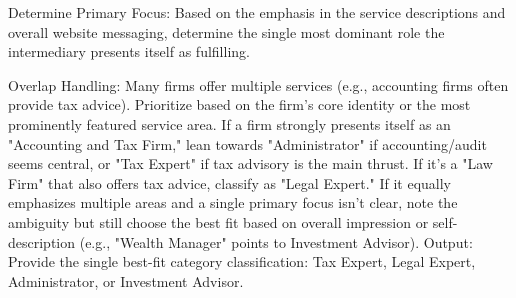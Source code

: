 Determine Primary Focus: Based on the emphasis in the service descriptions and overall website messaging, determine the single most dominant role the intermediary presents itself as fulfilling.

Overlap Handling: Many firms offer multiple services (e.g., accounting firms often provide tax advice). Prioritize based on the firm's core identity or the most prominently featured service area. If a firm strongly presents itself as an "Accounting and Tax Firm," lean towards "Administrator" if accounting/audit seems central, or "Tax Expert" if tax advisory is the main thrust. If it's a "Law Firm" that also offers tax advice, classify as "Legal Expert." If it equally emphasizes multiple areas and a single primary focus isn't clear, note the ambiguity but still choose the best fit based on overall impression or self-description (e.g., "Wealth Manager" points to Investment Advisor).
Output: Provide the single best-fit category classification: Tax Expert, Legal Expert, Administrator, or Investment Advisor.
